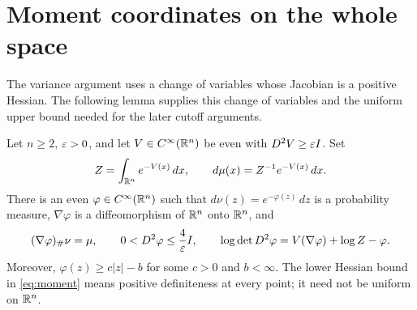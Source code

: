 \section{Moment coordinates on the whole space}\label{sec:moment}

The variance argument uses a change of variables whose Jacobian is a
positive Hessian.  The following lemma supplies this change of variables
and the uniform upper bound needed for the later cutoff arguments.

\begin{lemma}\label{lem:moment}
Let $n\ge2$, $\varepsilon>0$, and let $V\in C^\infty(\mathbb R^n)$ be even with
$D^2V\ge\varepsilon I$.  Set
\[
 Z=\int_{\mathbb R^n}e^{-V(x)}\,dx,
 \qquad d\mu(x)=Z^{-1}e^{-V(x)}\,dx.
\]
There is an even $\varphi\in C^\infty(\mathbb R^n)$ such that
$d\nu(z)=e^{-\varphi(z)}\,dz$ is a probability measure,
$\nabla\varphi$ is a diffeomorphism of $\mathbb R^n$ onto $\mathbb R^n$, and
\begin{equation}\label{eq:moment}
 (\nabla\varphi)_\#\nu=\mu,
 \qquad 0<D^2\varphi\le\frac4{\varepsilon} I,
 \qquad
 \log\det D^2\varphi
   =V(\nabla\varphi)+\log Z-\varphi.
\end{equation}
Moreover, $\varphi(z)\ge c|z|-b$ for some $c>0$ and $b<\infty$.
The lower Hessian bound in \eqref{eq:moment} means positive definiteness
at every point; it need not be uniform on $\mathbb R^n$.
\end{lemma}

